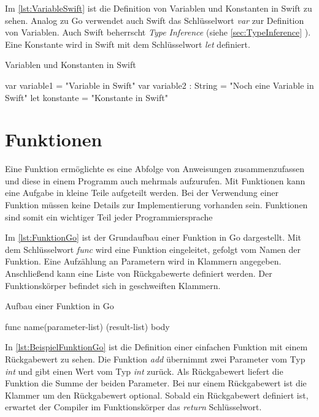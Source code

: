 Im \autoref{lst:VariableSwift} ist die Definition von Variablen und Konstanten in Swift zu sehen. 
Analog zu Go verwendet auch Swift das Schlüsselwort \emph{var} zur Definition von Variablen.
Auch Swift beherrscht \emph{Type Inference} (siehe \autoref{sec:TypeInference} ).
Eine Konstante wird in Swift mit dem Schlüsselwort \emph{let} definiert.

\begin{listing}
\caption{Variablen und Konstanten in Swift}
\label{lst:VariableSwift}
\begin{SwiftCode}
var variable1 = "Variable in Swift"
var variable2 : String = "Noch eine Variable in Swift"
let konstante = "Konstante in Swift"
\end{SwiftCode}
\end{listing}

\section{Funktionen}
Eine Funktion ermöglichte es eine Abfolge von Anweisungen zusammenzufassen und diese in einem Programm auch mehrmals aufzurufen. 
Mit Funktionen kann eine Aufgabe in kleine Teile aufgeteilt werden.
Bei der Verwendung einer Funktion müssen keine Details zur Implementierung vorhanden sein.
Funktionen sind somit ein wichtiger Teil jeder Programmiersprache \cite{Kennedy.2016}

Im \autoref{lst:FunktionGo} ist der Grundaufbau einer Funktion in Go dargestellt.
Mit dem Schlüsselwort \emph{func} wird eine Funktion eingeleitet, gefolgt vom Namen der Funktion.
Eine Aufzählung an Parametern wird in Klammern angegeben. 
Anschließend kann eine Liste von Rückgabewerte definiert werden.
Der Funktionskörper befindet sich in geschweiften Klammern.

\begin{listing}
\caption{Aufbau einer Funktion in Go \cite{Donovan.2016}}
\label{lst:FunktionGo}
\begin{GoCode}
func name(parameter-list) (result-list){
    body
}
\end{GoCode}
\end{listing}

In \autoref{lst:BeispielFunktionGo} ist die Definition einer einfachen Funktion mit einem Rückgabewert zu sehen. 
Die Funktion \emph{add} übernimmt zwei Parameter vom Typ \emph{int} und gibt einen Wert vom Typ \emph{int} zurück.
Als Rückgabewert liefert die Funktion die Summe der beiden Parameter.
Bei nur einem Rückgabewert ist die Klammer um den Rückgabewert optional.
Sobald ein Rückgabewert definiert ist, erwartet der Compiler im Funktionskörper das \emph{return} Schlüsselwort.

